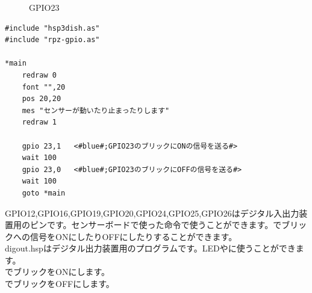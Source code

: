 \begin{figure}[H]
\begin{minipage}[t]{0.5\columnwidth}
    \caption{GPIO23}
  \end{minipage}
\end{figure}

\begin{lstlisting}[caption=digout.hsp,label=digout.hsp]
#include "hsp3dish.as"
#include "rpz-gpio.as"

*main
	redraw 0
	font "",20
	pos 20,20
	mes "センサーが動いたり止まったりします"
	redraw 1

	gpio 23,1	<#blue#;GPIO23のブリックにONの信号を送る#>
	wait 100
	gpio 23,0	<#blue#;GPIO23のブリックにOFFの信号を送る#>
	wait 100
	goto *main
\end{lstlisting}

GPIO12,GPIO16,GPIO19,GPIO20,GPIO24,GPIO25,GPIO26はデジタル入出力装置用のピンです。センサーボードで使った命令で使うことができます。でブリックへの信号をONにしたりOFFにしたりすることができます。\\

digout.hspはデジタル出力装置用のプログラムです。LEDやに使うことができます。\\
でブリックをONにします。\\
でブリックをOFFにします。\\

\begin{tcolorbox}[title=\useOmetoi]
\begin{enumerate}
\end{enumerate}
\end{tcolorbox}
\begin{tcolorbox}[title=\useOmetoi]
\begin{enumerate}
\end{enumerate}
\end{tcolorbox}

